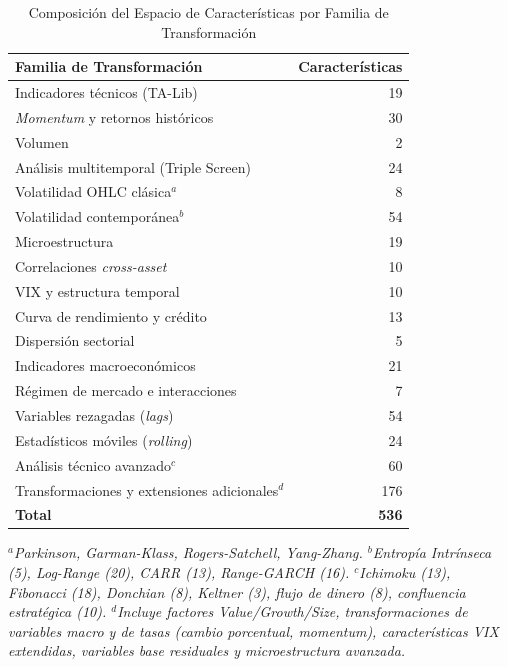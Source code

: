 ﻿\documentclass[11pt,a4paper]{article}
\begin{document}
\begin{table}[htbp]
\centering
\caption{Composici\'on del Espacio de Caracter\'isticas por Familia de Transformaci\'on}
\label{tab:feature_breakdown}
\small
\begin{tabular}{@{}lr@{}}
\toprule
\textbf{Familia de Transformaci\'on} & \textbf{Caracter\'isticas} \\
\midrule
Indicadores t\'ecnicos (TA-Lib) & 19 \\
\textit{Momentum} y retornos hist\'oricos & 30 \\
Volumen & 2 \\
An\'alisis multitemporal (Triple Screen) & 24 \\
Volatilidad OHLC cl\'asica$^a$ & 8 \\
Volatilidad contempor\'anea$^b$ & 54 \\
Microestructura & 19 \\
Correlaciones \textit{cross-asset} & 10 \\
VIX y estructura temporal & 10 \\
Curva de rendimiento y cr\'edito & 13 \\
Dispersi\'on sectorial & 5 \\
Indicadores macroecon\'omicos & 21 \\
R\'egimen de mercado e interacciones & 7 \\
Variables rezagadas (\textit{lags}) & 54 \\
Estad\'isticos m\'oviles (\textit{rolling}) & 24 \\
An\'alisis t\'ecnico avanzado$^c$ & 60 \\
Transformaciones y extensiones adicionales$^d$ & 176 \\
\midrule
\textbf{Total} & \textbf{536} \\
\bottomrule
\end{tabular}
\vspace{0.2cm}

\parbox{0.9\textwidth}{\footnotesize\textit{$^a$Parkinson, Garman-Klass, Rogers-Satchell, Yang-Zhang. $^b$Entrop\'ia Intr\'inseca (5), \textit{Log-Range} (20), CARR (13), \textit{Range-GARCH} (16). $^c$Ichimoku (13), Fibonacci (18), Donchian (8), Keltner (3), flujo de dinero (8), confluencia estrat\'egica (10). $^d$Incluye factores \textit{Value/Growth/Size}, transformaciones de variables macro y de tasas (cambio porcentual, \textit{momentum}), caracter\'isticas VIX extendidas, variables base residuales y microestructura avanzada.}}
\end{table}
\end{document}
